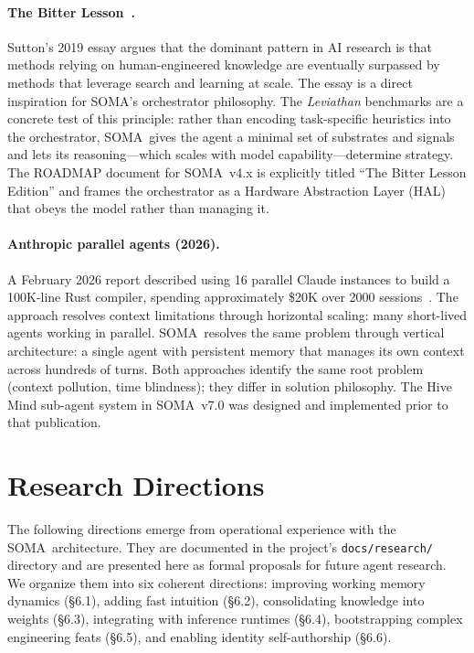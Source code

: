 \documentclass[11pt,a4paper]{article}
\newcommand{\soma}{\textsc{SOMA}}
\begin{document}
\paragraph{The Bitter Lesson~\cite{sutton2019bitter}.}
Sutton's 2019 essay argues that the dominant pattern in AI research is that
methods relying on human-engineered knowledge are eventually surpassed by
methods that leverage search and learning at scale.
The essay is a direct inspiration for \soma's orchestrator philosophy.
The \textit{Leviathan} benchmarks are a concrete test of this principle:
rather than encoding task-specific heuristics into the orchestrator,
\soma\ gives the agent a minimal set of substrates and signals and lets
its reasoning---which scales with model capability---determine strategy.
The ROADMAP document for \soma\ v4.x is explicitly titled
``The Bitter Lesson Edition'' and frames the orchestrator as a
Hardware Abstraction Layer (HAL) that obeys the model rather than
managing it.

\paragraph{Anthropic parallel agents (2026).}
A February 2026 report described using 16 parallel Claude instances
to build a 100K-line Rust compiler, spending approximately \$20K over
2000 sessions~\cite{anthropic2026compiler}.
The approach resolves context limitations through horizontal scaling:
many short-lived agents working in parallel.
\soma\ resolves the same problem through vertical architecture: a single
agent with persistent memory that manages its own context across hundreds
of turns.
Both approaches identify the same root problem (context pollution,
time blindness); they differ in solution philosophy.
The Hive Mind sub-agent system in \soma\ v7.0 was designed and
implemented prior to that publication.

\section{Research Directions}

The following directions emerge from operational experience with the
\soma\ architecture.
They are documented in the project's \texttt{docs/research/} directory
and are presented here as formal proposals for future agent research.
We organize them into six coherent directions: improving working memory
dynamics (\S6.1), adding fast intuition (\S6.2), consolidating knowledge
into weights (\S6.3), integrating with inference runtimes (\S6.4),
bootstrapping complex engineering feats (\S6.5), and enabling identity
self-authorship (\S6.6).
\end{document}
